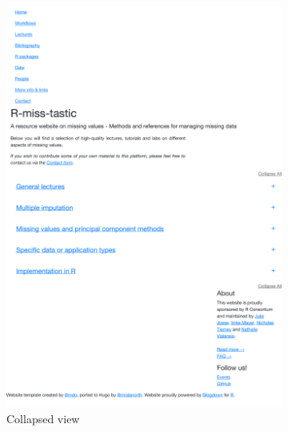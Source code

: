 \begin{figure}
\begin{center}
\begin{subfigure}[b]{0.63\textwidth}
\includegraphics[width=\textwidth]{figures/local-lectures.pdf}
\caption{Collapsed view}
\end{subfigure}
\begin{subfigure}[b]{0.36\textwidth}

\end{subfigure}
\end{center}
\end{figure}
